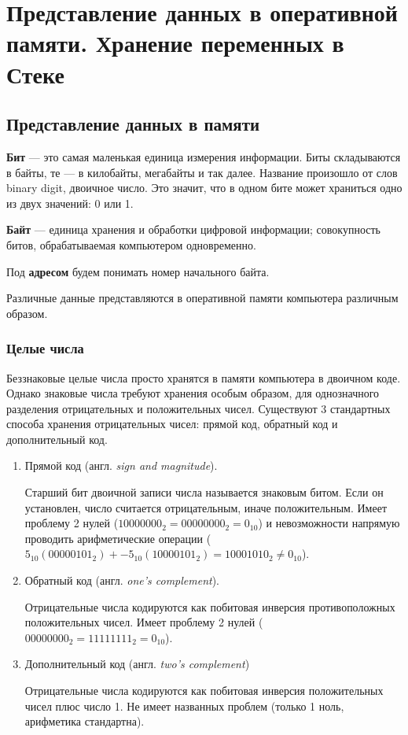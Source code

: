 \section{Представление данных в оперативной памяти. Хранение переменных в Стеке}

\subsection{Представление данных в памяти}

\textbf{Бит} --- это самая маленькая единица измерения информации. Биты
складываются в байты, те --- в килобайты, мегабайты и так далее.
Название произошло от слов binary digit, двоичное число. Это значит, что
в одном бите может храниться одно из двух значений: 0 или 1.

\textbf{Байт} --- единица хранения и обработки цифровой информации;
совокупность битов, обрабатываемая компьютером одновременно.

Под \textbf{адресом} будем понимать номер начального байта.

Различные данные представляются в оперативной памяти компьютера
различным образом.

\subsubsection{Целые числа}

Беззнаковые целые числа просто хранятся в памяти компьютера в двоичном
коде. Однако знаковые числа требуют хранения особым образом, для
однозначного разделения отрицательных и положительных чисел. Существуют
3 стандартных способа хранения отрицательных чисел: прямой код, обратный
код и дополнительный код.

\begin{enumerate}
\def\labelenumi{\arabic{enumi})}
\item
  Прямой код (англ. \emph{sign and magnitude}).

  Старший бит двоичной записи числа называется знаковым битом. Если он
  установлен, число считается отрицательным, иначе положительным. Имеет
  проблему 2 нулей (\(10000000_2=00000000_2=0_{10}\)) и невозможности
  напрямую проводить арифметические операции
  (\(5_{10}(00000101_2) + -5_{10}(10000101_2) = 10001010_2 \ne 0_{10}\)).
\item
  Обратный код (англ. \emph{one's complement}).

  Отрицательные числа кодируются как побитовая инверсия противоположных
  положительных чисел. Имеет проблему 2 нулей
  (\(00000000_2=11111111_2=0_{10}\)).
\item
  Дополнительный код (англ. \emph{two's complement})

  Отрицательные числа кодируются как побитовая инверсия положительных
  чисел плюс число 1. Не имеет названных проблем (только 1 ноль,
  арифметика стандартна).
\end{enumerate}


